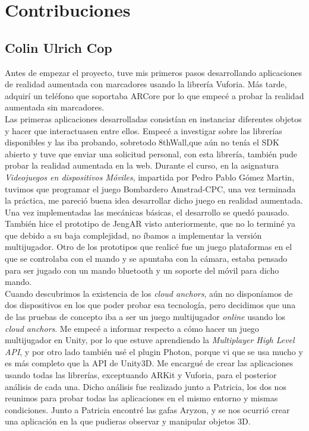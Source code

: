 \chapter{Contribuciones}
\section{Colin Ulrich Cop}
Antes de empezar el proyecto, tuve mis primeros pasos desarrollando aplicaciones de realidad aumentada con marcadores usando la librería Vuforia. Más tarde, adquirí un teléfono que soportaba ARCore por lo que empecé a probar la realidad aumentada sin marcadores.\\

Las primeras aplicaciones desarrolladas consistían en instanciar diferentes objetos y hacer que interactuasen entre ellos. Empecé a investigar sobre las librerías disponibles y las iba probando, sobretodo 8thWall,que aún no tenía el SDK abierto y tuve que enviar una solicitud personal, con esta librería, también pude probar la realidad aumentada en la web. Durante el curso, en la asignatura \textit{Videojuegos en dispositivos Móviles}, impartida por Pedro Pablo Gómez Martin, tuvimos que programar el juego Bombardero Amstrad-CPC, una vez terminada la práctica, me pareció buena idea desarrollar dicho juego en realidad aumentada. Una vez implementadas las mecánicas básicas, el desarrollo se quedó pausado. También hice el prototipo de JengAR visto anteriormente, que no lo terminé ya que debido a su baja complejidad, no íbamos a implementar la versión multijugador. Otro de los prototipos que realicé fue un juego plataformas en el que se controlaba con el mando y se apuntaba con la cámara, estaba pensado para ser jugado con un mando bluetooth y un soporte del móvil para dicho mando. \\

Cuando descubrimos la existencia de los \textit{cloud anchors}, aún no disponíamos de dos dispositivos en los que poder probar esa tecnología, pero decidimos que una de las pruebas de concepto iba a ser un juego multijugador \textit{online} usando los \textit{cloud anchors}. Me empecé a informar respecto a cómo hacer un juego multijugador en Unity, por lo que estuve aprendiendo la \textit{Multiplayer High Level API}, y por otro lado también usé el plugin Photon\cite{pun}, porque vi que se usa mucho y es más completo que la API de Unity3D. Me encargué de crear las aplicaciones usando todas las librerías, exceptuando ARKit y Vuforia, para el posterior análisis de cada una. Dicho análisis fue realizado junto a Patricia, los dos nos reunimos para probar todas las aplicaciones en el mismo entorno y mismas condiciones. Junto a Patricia encontré las gafas Aryzon\cite{Aryzon}, y se nos ocurrió crear una aplicación en la que pudieras observar y manipular objetos 3D.\\

